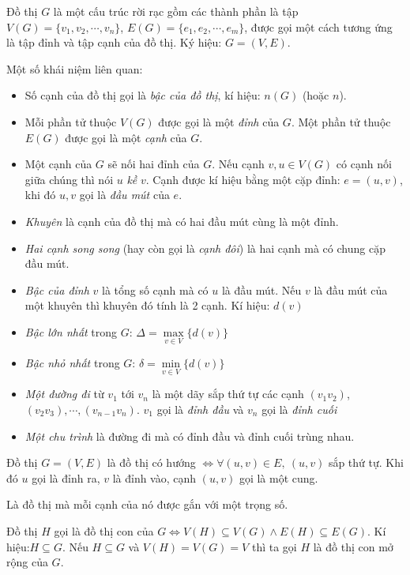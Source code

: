 
\begin{definition}
	Đồ thị $G$ là một cấu trúc rời rạc gồm các thành phần là tập ${V(G) = \{v_1,v_2,\cdots,v_n\}}$, $E(G) = \{e_1,e_2,\cdots,e_m\}$, được gọi một cách tương ứng là tập đỉnh và tập cạnh của đồ thị. Ký hiệu: $G = (V, E)$.
\end{definition}
Một số khái niệm liên quan:
\begin{itemize}
	\item Số cạnh của đồ thị gọi là \textit{bậc của đồ thị}, kí hiệu: $n(G)$ (hoặc $n$).
	\item Mỗi phần tử thuộc $V(G)$ được gọi là một \textit{đỉnh} của $G$. Một phần tử thuộc $E(G)$ được gọi là một \textit{cạnh} của $G$.
	\item Một cạnh của $G$ sẽ nối hai đỉnh của $G$. Nếu cạnh $v,u \in V(G)$ có cạnh nối giữa chúng thì nói $u$ \textit{kề} $v$. Cạnh được kí hiệu bằng một cặp đỉnh: $e = (u,v)$, khi đó $u,v$ gọi là \textit{đầu mút} của $e$.
	\item \textit{Khuyên} là cạnh của đồ thị mà có hai đầu mút cùng là một đỉnh.
	\item \textit{Hai cạnh song song} (hay còn gọi là \textit{cạnh đôi}) là hai cạnh mà có chung cặp đầu mút.
	\item \textit{Bậc của đỉnh} $v$ là tổng số cạnh mà có $u$ là đầu mút. Nếu $v$ là đầu mút của một khuyên thì khuyên đó tính là 2 cạnh. Kí hiệu: $d(v)$
	\item \textit{Bậc lớn nhất} trong $G$: $\Delta = \max\limits_{v\in V} \{d(v)\}$
	\item \textit{Bậc nhỏ nhất} trong $G$: $\delta = \min\limits_{v\in V} \{d(v)\}$
	\item \textit{Một đường đi} từ $v_1$ tới $v_n$ là một dãy sắp thứ tự các cạnh $(v_1v_2)$, $(v_2v_3),\cdots,(v_{n-1}v_n)$. $v_1$ gọi là \textit{đỉnh đầu} và $v_n$ gọi là \textit{đỉnh cuối}
	\item \textit{Một chu trình} là đường đi mà có đỉnh đầu và đỉnh cuối trùng nhau.
\end{itemize}


\begin{definition}
	Đồ thị $G=(V,E)$ là đồ thị có hướng $\iff \forall (u,v)\in E,\ (u,v)$ sắp thứ tự. Khi đó $u$ gọi là đỉnh ra, $v$ là đỉnh vào, cạnh $(u,v)$ gọi là một cung.
\end{definition}


\begin{definition}
	 Là đồ thị mà mỗi cạnh của nó được gắn với một trọng số.
\end{definition}
\begin{definition}
	 Đồ thị $H$ gọi là đồ thị con của $G \iff V(H) \subseteq V(G) \land E(H) \subseteq E(G)$. Kí hiệu:$H \subseteq G$. Nếu $H \subseteq G$ và $V(H) = V(G) = V$ thì ta gọi $H$ là đồ thị con mở rộng của $G$.
\end{definition}

